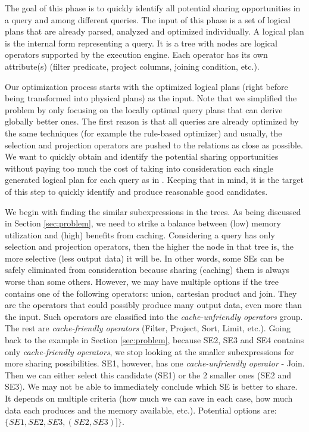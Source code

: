 The goal of this phase is to quickly identify all potential sharing opportunities in a query and among different queries. The input of this phase is a set of logical plans that are already parsed, analyzed and optimized individually. A logical plan is the internal form representing a query. It is a tree with nodes are logical operators supported by the execution engine. Each operator has its own attribute(s) (filter predicate, project columns, joining condition, etc.).

Our optimization process starts with the optimized logical plans (right before being transformed into physical plans) as the input. Note that we simplified the problem by only focusing on the locally optimal query plans that can derive globally better ones. The first reason is that all queries are already optimized by the same techniques (for example the rule-based optimizer) and usually, the selection and projection operators are pushed to the relations as close as possible. We want to quickly obtain and identify the potential sharing opportunities without paying too much the cost of taking into consideration each single generated logical plan for each query as in \cite{zhou2007efficient}. Keeping that in mind, it is the target of this step to quickly identify and produce reasonable good candidates.

We begin with finding the similar subexpressions in the trees. As being discussed in Section \ref{sec:problem}, we need to strike a balance between (low) memory utilization and (high) benefits from caching. Considering a query has only selection and projection operators, then the higher the node in that tree is, the more selective (less output data) it will be. In other words, some SEs can be safely eliminated from consideration because sharing (caching) them is always worse than some others. However, we may have multiple options if the tree contains one of the following operators: union, cartesian product and join. They are the operators that could possibly produce many output data, even more than the input. Such operators are classified into the \emph{cache-unfriendly operators} group. The rest are \emph{cache-friendly operators} (Filter, Project, Sort, Limit, etc.). Going back to the example in Section \ref{sec:problem}, because SE2, SE3 and SE4 contains only \emph{cache-friendly operators}, we stop looking at the smaller subexpressions for more sharing possibilities. SE1, however, has one \emph{cache-unfriendly operator} - Join. Then we can either select this candidate (SE1) or the 2 smaller ones (SE2 and SE3). We may not be able to immediately conclude which SE is better to share. It depends on multiple criteria (how much we can save in each case, how much data each produces and the memory available, etc.). Potential options are: $\{SE1, SE2, SE3, (SE2, SE3)]\}$.

